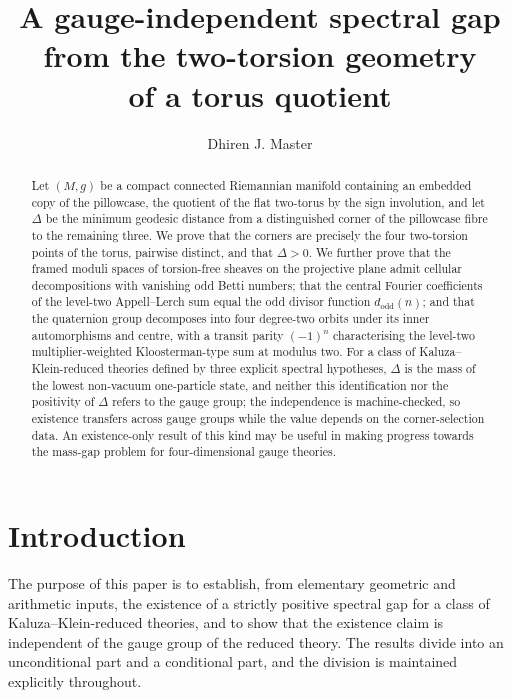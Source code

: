 \documentclass[11pt,a4paper]{article}
\title{A gauge-independent spectral gap from the two-torsion geometry\\ of a torus quotient}
\author{Dhiren J. Master}
\date{}
\newcommand{\dodd}{d_{\mathrm{odd}}}
\theoremstyle{plain}
\theoremstyle{definition}
\theoremstyle{remark}
\begin{document}
\maketitle

\begin{abstract}
Let $(M,g)$ be a compact connected Riemannian manifold containing an embedded copy of the pillowcase, the quotient of the flat two-torus by the sign involution, and let $\Delta$ be the minimum geodesic distance from a distinguished corner of the pillowcase fibre to the remaining three. We prove that the corners are precisely the four two-torsion points of the torus, pairwise distinct, and that $\Delta > 0$. We further prove that the framed moduli spaces of torsion-free sheaves on the projective plane admit cellular decompositions with vanishing odd Betti numbers; that the central Fourier coefficients of the level-two Appell--Lerch sum equal the odd divisor function $\dodd(n)$; and that the quaternion group decomposes into four degree-two orbits under its inner automorphisms and centre, with a transit parity $(-1)^n$ characterising the level-two multiplier-weighted Kloosterman-type sum at modulus two. For a class of Kaluza--Klein-reduced theories defined by three explicit spectral hypotheses, $\Delta$ is the mass of the lowest non-vacuum one-particle state, and neither this identification nor the positivity of $\Delta$ refers to the gauge group; the independence is machine-checked, so existence transfers across gauge groups while the value depends on the corner-selection data. An existence-only result of this kind may be useful in making progress towards the mass-gap problem for four-dimensional gauge theories.
\end{abstract}

\section{Introduction}\label{sec:intro}

The purpose of this paper is to establish, from elementary geometric and arithmetic inputs, the existence of a strictly positive spectral gap for a class of Kaluza--Klein-reduced theories, and to show that the existence claim is independent of the gauge group of the reduced theory. The results divide into an unconditional part and a conditional part, and the division is maintained explicitly throughout.
\end{document}
